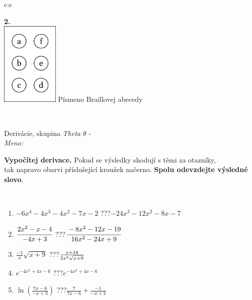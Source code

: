 \documentclass[10pt]{report}
\begin{document}
\begin{tabular}{c:c}
\begin{minipage}[c][104.5mm][t]{0.5\linewidth}
\begin{center}
\begin{minipage}{0.20\linewidth}
\begin{center}
{\Huge\bfseries 2.} \\[2mm]
\includegraphics[height=40mm]{../images/braille.png}
{\small Písmeno Braillovej abecedy}
\end{center}
\end{minipage}
\end{center}
\end{minipage}
\\ \hdashline
\begin{minipage}[c][104.5mm][t]{0.5\linewidth}
\begin{center}
\vspace{7mm}
{\huge Derivácie, skupina \textit{Theta $\theta$} -}\\[5mm]
\textit{Meno:}\phantom{xxxxxxxxxxxxxxxxxxxxxxxxxxxxxxxxxxxxxxxxxxxxxxxxxxxxxxxxxxxxxxxxx}\\[5mm]
\begin{minipage}{0.95\linewidth}
\begin{center}
\textbf{Vypočítej derivace.} Pokud se výsledky shodují s těmi za otazníky,\\tak napravo obarvi příslušející kroužek načerno. \textbf{Spolu odevzdejte výsledné slovo}.
\end{center}
\end{minipage}
\\[1mm]
\begin{minipage}{0.79\linewidth}
\begin{center}
\begin{varwidth}{\linewidth}
\begin{enumerate}
\normalsize
\item $-6x^4-4x^3-4x^2-7x-2$\quad \dotfill\; ???\;\dotfill \quad $-24x^3-12x^2-8x-7$
\item $\cfrac{2x^2-x-4}{-4x+3}$\quad \dotfill\; ???\;\dotfill \quad $\cfrac{-8x^2-12x-19}{16x^2-24x+9}$
\item $\frac{-1}{x}\sqrt{x+9}$\quad \dotfill\; ???\;\dotfill \quad $\frac{x+18}{2x^2 \sqrt{\smash[b]{x+9}}}$
\item $e^{-4x^2+4x-6}$\quad \dotfill\; ???\;\dotfill \quad $e^{-4x^2+4x-6}$
\item $\ln{\left(\frac{7x-6}{-x+3}\right)}$\quad \dotfill\; ???\;\dotfill \quad $\frac{7}{7x-6}+\frac{-1}{-x+3}$

\end{enumerate}
\end{varwidth}
\end{center}
\end{minipage}
\end{center}
\end{minipage}
\end{tabular}
\end{document}
